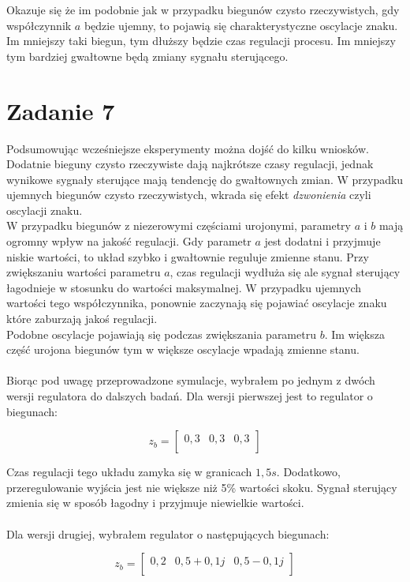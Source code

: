 \documentclass[a4paper,titlepage,11pt,floatssmall]{mwrep}
\begin{document}
Okazuje się że im podobnie jak w przypadku biegunów czysto rzeczywistych, gdy współczynnik $a$ będzie ujemny, to pojawią się charakterystyczne oscylacje znaku. Im mniejszy taki biegun, tym dłuższy będzie czas regulacji procesu. Im mniejszy tym bardziej gwałtowne będą zmiany sygnału sterującego.
\newpage

\section{Zadanie 7}
Podsumowując wcześniejsze eksperymenty można dojść do kilku wniosków. Dodatnie bieguny czysto rzeczywiste dają najkrótsze czasy regulacji, jednak wynikowe sygnały  sterujące mają tendencję do gwałtownych zmian. W przypadku ujemnych biegunów czysto rzeczywistych, wkrada się efekt \emph{dzwonienia} czyli oscylacji znaku. \\
\indent W przypadku biegunów z niezerowymi częściami urojonymi, parametry $a$ i $b$ mają ogromny wpływ na jakość regulacji. Gdy parametr $a$ jest dodatni i przyjmuje niskie wartości, to układ szybko i gwałtownie reguluje zmienne stanu. Przy zwiększaniu wartości parametru $a$, czas regulacji wydłuża się ale sygnał sterujący łagodnieje w stosunku do wartości maksymalnej. W przypadku ujemnych wartości tego współczynnika, ponownie zaczynają się pojawiać oscylacje znaku które zaburzają jakoś regulacji.\\
\indent Podobne oscylacje pojawiają się podczas zwiększania parametru $b$. Im większa część urojona biegunów tym w większe oscylacje wpadają zmienne stanu. 
\\
\bigskip
\\
\indent Biorąc pod uwagę przeprowadzone symulacje, wybrałem po jednym z dwóch wersji regulatora do dalszych badań.
Dla wersji pierwszej jest to regulator o biegunach:

\[
z_b = 
\begin{bmatrix}
    0,3  &  0,3  & 0,3    \\     
\end{bmatrix}
\]

Czas regulacji tego układu zamyka się w granicach $1,5s$. Dodatkowo, przeregulowanie wyjścia jest nie większe niż 5\% wartości skoku. Sygnał sterujący zmienia się w sposób łagodny i przyjmuje niewielkie wartości.  \\
\bigskip 
\\
\indent Dla wersji drugiej, wybrałem regulator o następujących biegunach:

\[
z_b = 
\begin{bmatrix}
    0,2  &  0,5 + 0,1j  & 0,5 - 0,1j    \\     
\end{bmatrix}
\]
\end{document}
